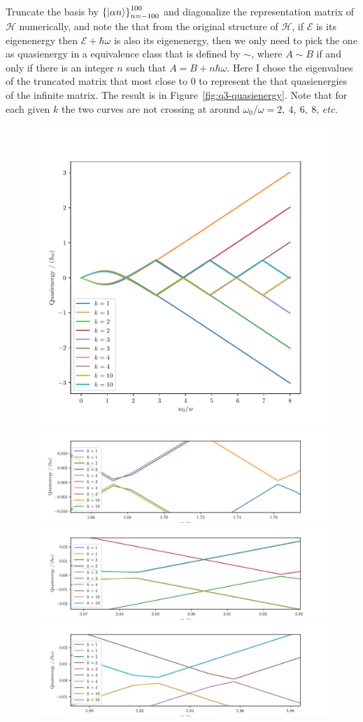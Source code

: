 \documentclass{article}
\newcommand{\set}[1]{\ensuremath{\left\{{#1}\right\}}}
\begin{document}
\begin{enumerate}[1.]
\begin{enumerate}[(i)]
    Truncate the basis by $\set{\ket{\alpha n}}_{n=-100}^{100}$ and diagonalize the representation matrix of $\mathcal{H}$ numerically, and note the that from the original structure of $\mathcal{H}$, if $\mathcal{E}$ is its eigenenergy then $\mathcal{E} + \hbar\omega$ is also its eigenenergy, then we only need to pick the one as quasienergy in a equivalence class that is defined by $\sim$, where $A \sim B$ if and only if there is an integer $n$ such that $A = B+n\hbar\omega$. Here I chose the eigenvalues of the truncated matrix that most close to 0 to represent the that quasienergies of the infinite matrix. The result is in Figure~\ref{fig:q3-quasienergy}. Note that for each given $k$ the two curves are not crossing at around $\omega_0/\omega = 2,\ 4,\ 6,\ 8,\ \textit{etc.}$
    \begin{figure}[H]
      \centering
      \includegraphics[width=0.6\linewidth]{q3-quasienergy.pdf}
      \includegraphics[width=0.6\linewidth]{q3-1-2.pdf}
      \includegraphics[width=0.6\linewidth]{q3-1-4.pdf}
      \includegraphics[width=0.6\linewidth]{q3-1-6.pdf}

\end{figure}
\end{enumerate}
\end{enumerate}
\end{document}
